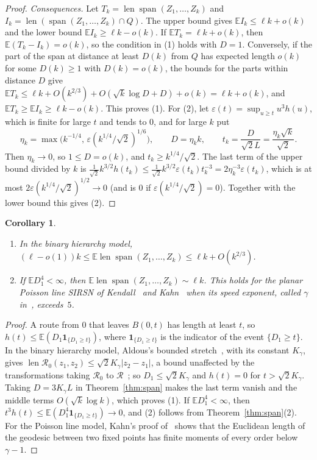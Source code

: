 \documentclass[11pt]{amsart}
\newtheorem{corollary}[theorem]{Corollary}
\theoremstyle{remark}
\newcommand{\E}{\mathbb{E}}
\newcommand{\len}{\operatorname{len}}
\newcommand{\spn}{\operatorname{span}}
\begin{document}
\begin{proof}
\emph{Consequences.} Let $T_k=\len\spn(Z_1,\dots,Z_k)$ and $I_k=\len(\spn(Z_1,\dots,Z_k)\cap Q)$. The upper bound
gives $\E I_k\le\ell k+o(k)$ and the lower bound $\E I_k\ge\ell k-o(k)$. If $\E T_k=\ell k+o(k)$, then
$\E(T_k-I_k)=o(k)$, so the condition in (1) holds with $D=1$. Conversely, if the part of the span at distance at least
$D(k)$ from $Q$ has expected length $o(k)$ for some $D(k)\ge1$ with $D(k)=o(k)$, the bounds for the parts within
distance $D$ give $\E T_k\le\ell k+O(k^{2/3})+O(\sqrt k\log D+D)+o(k)=\ell k+o(k)$, and $\E T_k\ge\E I_k\ge\ell k-o(k)$.
This proves (1). For (2), let $\varepsilon(t)=\sup_{u\ge t}u^3h(u)$, which is finite for large $t$ and tends to $0$,
and for large $k$ put
\[
\eta_k=\max\bigl(k^{-1/4},\,\varepsilon(k^{1/4}/\sqrt2)^{1/6}\bigr),\qquad D=\eta_kk,\qquad t_k=\frac{D}{\sqrt2L}
=\frac{\eta_k\sqrt k}{\sqrt2}.
\]
Then $\eta_k\to0$, so $1\le D=o(k)$, and $t_k\ge k^{1/4}/\sqrt2$. The last term of the upper bound divided by $k$ is
$\tfrac1{\sqrt2}k^{3/2}h(t_k)\le\tfrac1{\sqrt2}k^{3/2}\varepsilon(t_k)t_k^{-3}=2\eta_k^{-3}\varepsilon(t_k)$, which is at
most $2\varepsilon(k^{1/4}/\sqrt2)^{1/2}\to0$ (and is $0$ if $\varepsilon(k^{1/4}/\sqrt2)=0$). Together with the
lower bound this gives (2).
\end{proof}

\begin{corollary}\label{cor:span}
\begin{enumerate}
\item In the binary hierarchy model, $(\ell-o(1))k\le\E\len\spn(Z_1,\dots,Z_k)\le\ell k+O(k^{2/3})$.
\item If $\E D_1^4<\infty$, then $\E\len\spn(Z_1,\dots,Z_k)\sim\ell k$. This holds for the planar Poisson line SIRSN
of Kendall~\cite{K17} and Kahn~\cite{Kahn16} when its speed exponent, called $\gamma$ in~\cite{Kahn16}, exceeds~$5$.
\end{enumerate}
\end{corollary}

\begin{proof}
A route from $0$ that leaves $B(0,t)$ has length at least $t$, so $h(t)\le\E(D_1\mathbf 1_{\{D_1\ge t\}})$, where
$\mathbf 1_{\{D_1\ge t\}}$ is the indicator of the event $\{D_1\ge t\}$. In the binary hierarchy model, Aldous's bounded
stretch~\cite[Proposition~3.1]{A14}, with its constant $K_\gamma$, gives
$\len\mathcal R_0(z_1,z_2)\le\sqrt2K_\gamma|z_2-z_1|$, a bound unaffected by the transformations taking $\mathcal R_0$
to $\mathcal R$~\cite[Section~3.7, p.~21]{A14}; so $D_1\le\sqrt2K_\gamma$ and $h(t)=0$ for $t>\sqrt2K_\gamma$. Taking
$D=3K_\gamma L$ in Theorem~\ref{thm:span} makes the last term vanish and the middle terms $O(\sqrt k\log k)$, which
proves (1). If $\E D_1^4<\infty$, then $t^3h(t)\le\E(D_1^4\mathbf 1_{\{D_1\ge t\}})\to0$, and (2) follows from
Theorem~\ref{thm:span}(2). For the Poisson line model, Kahn's proof of~\cite[Theorem~5.1]{Kahn16} shows that the
Euclidean length of the geodesic between two fixed points has finite moments of every order below $\gamma-1$.
\end{proof}
\end{document}
